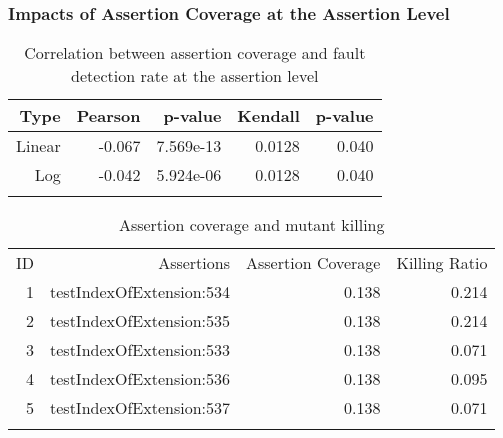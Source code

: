 

\subsubsection{Impacts of Assertion Coverage at the Assertion Level}


\begin{table}[!t]
\renewcommand{\arraystretch}{1.3}
\tiny
\caption{Correlation between assertion coverage and fault detection rate at the assertion level}
\label{table:t_cor_ass_test}
\centering
\begin{tabular}
{rrrrr}
\Xhline{2\arrayrulewidth}
Type & Pearson & p-value &Kendall & p-value\\
\hline
Linear & -0.067& 7.569e-13 & 0.0128 & 0.040\\
Log & -0.042& 5.924e-06    & 0.0128 & 0.040\\
\Xhline{2\arrayrulewidth}
\end{tabular}
\end{table}

\begin{table}[t]
\renewcommand{\arraystretch}{1.3}
\tiny
\caption{Assertion coverage and mutant killing}
\label{table:t_3}
\centering \begin{tabular}
{r|r|r|r}
\Xhline{2\arrayrulewidth}
ID & Assertions & Assertion Coverage & Killing Ratio\\
\Xhline{2\arrayrulewidth}
1&testIndexOfExtension:534&0.138&0.214\\
2&testIndexOfExtension:535&0.138&0.214\\
\hline
3&testIndexOfExtension:533&0.138&0.071\\
4&testIndexOfExtension:536&0.138&0.095\\
5&testIndexOfExtension:537&0.138&0.071\\
\Xhline{2\arrayrulewidth}
\end{tabular}
\end{table}

